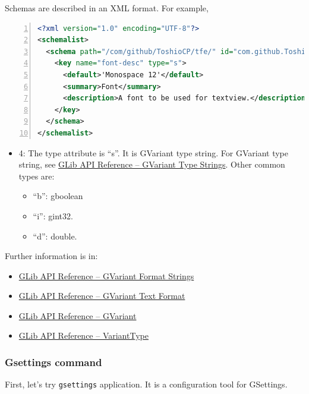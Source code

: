 Schemas are described in an XML format. For example,

\begin{lstlisting}[language=XML, numbers=left]
<?xml version="1.0" encoding="UTF-8"?>
<schemalist>
  <schema path="/com/github/ToshioCP/tfe/" id="com.github.ToshioCP.tfe">
    <key name="font-desc" type="s">
      <default>'Monospace 12'</default>
      <summary>Font</summary>
      <description>A font to be used for textview.</description>
    </key>
  </schema>
</schemalist>
\end{lstlisting}

\begin{itemize}
\tightlist
\item
  4: The type attribute is ``s''. It is GVariant type string. For
  GVariant type string, see
  \href{https://docs.gtk.org/glib/struct.VariantType.html\#gvariant-type-strings}{GLib
  API Reference -- GVariant Type Strings}. Other common types are:

  \begin{itemize}
  \tightlist
  \item
    ``b'': gboolean
  \item
    ``i'': gint32.
  \item
    ``d'': double.
  \end{itemize}
\end{itemize}

Further information is in:

\begin{itemize}
\tightlist
\item
  \href{https://docs.gtk.org/glib/gvariant-format-strings.html}{GLib API
  Reference -- GVariant Format Strings}
\item
  \href{https://docs.gtk.org/glib/gvariant-text.html}{GLib API Reference
  -- GVariant Text Format}
\item
  \href{https://docs.gtk.org/glib/struct.Variant.html}{GLib API
  Reference -- GVariant}
\item
  \href{https://docs.gtk.org/glib/struct.VariantType.html}{GLib API
  Reference -- VariantType}
\end{itemize}

\subsubsection{Gsettings command}\label{gsettings-command}

First, let's try \passthrough{\lstinline!gsettings!} application. It is
a configuration tool for GSettings.

